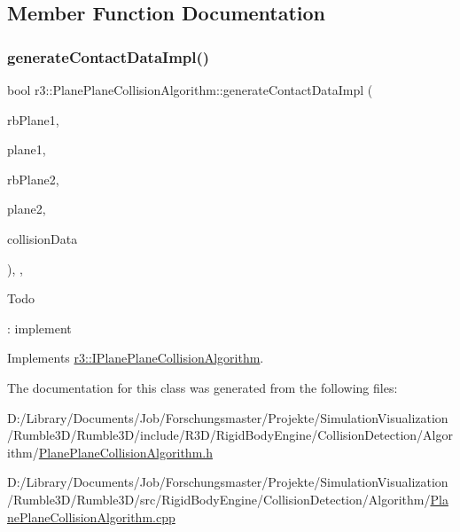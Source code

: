 \subsection{Member Function Documentation}
\mbox{\label{classr3_1_1_plane_plane_collision_algorithm_a33400ba57a8c0550ada0778bb92eeb69}} 
\subsubsection{\texorpdfstring{generate\+Contact\+Data\+Impl()}{generateContactDataImpl()}}
{\footnotesize\ttfamily bool r3\+::\+Plane\+Plane\+Collision\+Algorithm\+::generate\+Contact\+Data\+Impl (\begin{DoxyParamCaption}\item[{\mbox{\hyperlink{classr3_1_1_rigid_body}{Rigid\+Body}} $\ast$}]{rb\+Plane1,  }\item[{\mbox{\hyperlink{classr3_1_1_collision_plane}{Collision\+Plane}} $\ast$}]{plane1,  }\item[{\mbox{\hyperlink{classr3_1_1_rigid_body}{Rigid\+Body}} $\ast$}]{rb\+Plane2,  }\item[{\mbox{\hyperlink{classr3_1_1_collision_plane}{Collision\+Plane}} $\ast$}]{plane2,  }\item[{\mbox{\hyperlink{classr3_1_1_collision_data}{Collision\+Data}} \&}]{collision\+Data }\end{DoxyParamCaption})\hspace{0.3cm}{\ttfamily [override]}, {\ttfamily [protected]}, {\ttfamily [virtual]}}

\begin{DoxyRefDesc}{Todo}
\item[\mbox{\hyperlink{todo__todo000011}{Todo}}]\+: implement \end{DoxyRefDesc}


Implements \mbox{\hyperlink{classr3_1_1_i_plane_plane_collision_algorithm_a708dec70f58b4476976dfea9921d1524}{r3\+::\+I\+Plane\+Plane\+Collision\+Algorithm}}.



The documentation for this class was generated from the following files\+:\begin{DoxyCompactItemize}
\item 
D\+:/\+Library/\+Documents/\+Job/\+Forschungsmaster/\+Projekte/\+Simulation\+Visualization/\+Rumble3\+D/\+Rumble3\+D/include/\+R3\+D/\+Rigid\+Body\+Engine/\+Collision\+Detection/\+Algorithm/\mbox{\hyperlink{_plane_plane_collision_algorithm_8h}{Plane\+Plane\+Collision\+Algorithm.\+h}}\item 
D\+:/\+Library/\+Documents/\+Job/\+Forschungsmaster/\+Projekte/\+Simulation\+Visualization/\+Rumble3\+D/\+Rumble3\+D/src/\+Rigid\+Body\+Engine/\+Collision\+Detection/\+Algorithm/\mbox{\hyperlink{_plane_plane_collision_algorithm_8cpp}{Plane\+Plane\+Collision\+Algorithm.\+cpp}}\end{DoxyCompactItemize}
